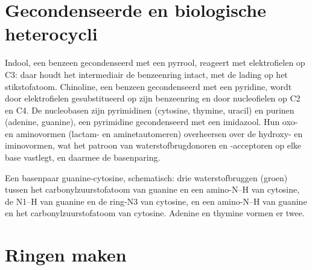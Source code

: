 \section{Gecondenseerde en biologische heterocycli}

Indool, een benzeen gecondenseerd met een pyrrool, reageert met
elektrofielen op C3: daar houdt het intermediair de benzeenring intact,
met de lading op het stikstofatoom. Chinoline, een benzeen gecondenseerd
met een pyridine, wordt door elektrofielen gesubstitueerd op zijn
benzeenring en door nucleofielen op C2 en C4. De nucleobasen zijn
pyrimidinen (cytosine, thymine, uracil) en purinen (adenine, guanine),
een pyrimidine gecondenseerd met een imidazool. Hun oxo- en aminovormen
(lactam- en aminetautomeren) overheersen over de hydroxy- en iminovormen,
wat het patroon van waterstofbrugdonoren en -acceptoren op elke base
vastlegt, en daarmee de basenparing.

\begin{omfigure}

{\small Een basenpaar guanine-cytosine, schematisch: drie waterstofbruggen
(groen) tussen het carbonylzuurstofatoom van guanine en een amino-N--H van cytosine, de N1--H van
guanine en de ring-N3 van cytosine, en een amino-N--H van guanine en het
carbonylzuurstofatoom van cytosine. Adenine en thymine vormen er twee.}
\end{omfigure}

\section{Ringen maken}

